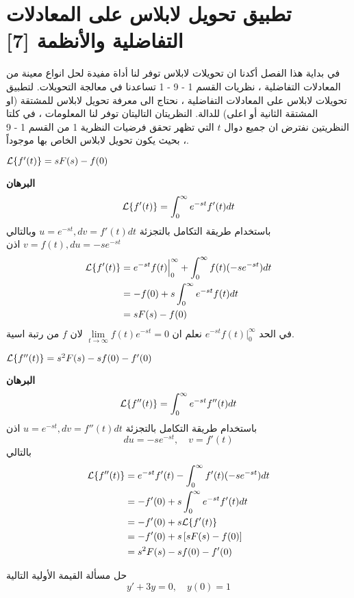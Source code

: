    \section{ تطبيق تحويل لابلاس على المعادلات التفاضلية والأنظمة [7]}
   في بداية هذا الفصل أكدنا ان تحويلات لابلاس توفر لنا أداة مفيدة لحل انواع معينة من المعادلات التفاضلية ، نظريات القسم 1 - 9 - 1 تساعدنا في معالجة التحويلات. لتطبيق تحويلات لابلاس على المعادلات التفاضلية ، نحتاج الى معرفة تحويل لابلاس للمشتقة (او المشتقة الثانية أو اعلى) للدالة. النظريتان التاليتان توفر لنا المعلومات ، في كلتا النظريتين نفترض ان جميع دوال $t$ التي تظهر تحقق فرضيات النظرية 1 من القسم 1 - 9 ، بحيث يكون تحويل لابلاس الخاص بها موجوداً.
   
   \begin{theorem}[{[7]}]
   	$\mathcal{L}\{f'(t)\} = sF(s) - f(0)$
   \end{theorem}
   \noindent
   \textbf{البرهان}
   \[
   \mathcal{L}\{f'(t)\} = \int_{0}^{\infty} e^{-st} f'(t)dt
   \]
   باستخدام طريقة التكامل بالتجزئة $u=e^{-st} , dv = f'(t)dt$ وبالتالي
   $v=f(t), du = -se^{-st}$ اذن
   \begin{align*}
   	\mathcal{L}\{f'(t)\} &= e^{-st} f(t)\Big|^\infty_0 + \int_{0}^{\infty} f(t) (-se^{-st}) dt\\
   	&= -f(0) + s \int_{0}^{\infty} e^{-st} f(t) dt\\
   	&= sF(s) - f(0)
   \end{align*}
   في الحد 
   $e^{-st} f(t)\Big|^\infty_0 $
   نعلم ان 
   $\lim\limits_{t\to \infty} f(t) e^{-st} = 0$ لان $f$ من رتبة اسية.
   
   \begin{theorem}[{[7]}]
   	$\mathcal{L}\{f''(t)\} = s^2F(s) - sf(0) - f'(0)$ 
   \end{theorem}
   \noindent
   \textbf{البرهان}
   \[
   \mathcal{L}\{f''(t)\} = \int_{0}^{\infty} e^{-st} f''(t) dt
   \]
   باستخدام طريقة التكامل بالتجزئة 
   $u=e^{-st} , dv = f''(t) dt$ اذن
   \[
   du = -se^{-st}, \quad v= f'(t)
   \]
   بالتالي
   \begin{align*}
   	\mathcal{L}\{f''(t)\} &= e^{-st} f'(t) - \int_{0}^{\infty} f'(t) (-se^{-st} ) dt\\
   	&= -f'(0) + s \int_{0}^{\infty} e^{-st} f'(t)dt\\
   	&= -f'(0) + s\mathcal{L}\{f'(t)\}\\
   	&= -f'(0) + s \left[sF(s) - f(0)\right]\\
   	&= s^2F(s) - sf(0) - f'(0)
    \end{align*}
    
    \begin{example}
    	حل مسألة القيمة الأولية التالية
    	\[
    	y' + 3y = 0,\quad y(0) = 1
    	\]
    \end{example}
 
